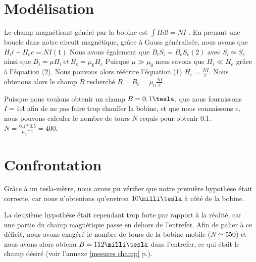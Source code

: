\section{Modélisation}
Le champ magnétisant généré par la bobine est $\int{H dl} = N I$ .
En prenant une boucle dans notre circuit magnétique, grâce à Gauss généralisée, nous avons que
$H_i l + H_e e = N I (1)$
Nous avons également que $B_i S_i = B_e S_e (2)$  avec $S_i \simeq S_e$
ainsi que $B_i = \mu H_i \:et\:  B_e = \mu_0 H_e$
Puisque $\mu \gg \mu_0$ nous savons que $H_i \ll H_e$ grâce à l'équation (2).
Nous pouvons alors réécrire l'équation (1) $H_e = \frac{N I}{e}$.
Nous obtenons alors le champ $B$ recherché $B = B_e = \mu_0 \frac{N I}{e}$.

Puisque nous voulons obtenir un champ $B = 0,1 \tesla$, que nous fournissons $I = 1 A$ afin de ne pas faire trop 
chauffer la bobine, et que nous connaissons $e$, nous pouvons calculer le nombre de tours $N$ requis pour obtenir 0.1\tesla.
$N = \frac{0.1 * 0.5}{\mu_0 * 1} = 400$.

\section{Confrontation}
Grâce à un tesla-mètre, nous avons pu vérifier que notre première hypothèse était correcte, car nous n'obtenions 
qu'environ $10 \milli\tesla$ à côté de la bobine. 

La deuxième hypothèse était cependant trop forte par rapport à la réalité, car une 
partie du champ magnétique passe en dehors de l'entrefer. Afin de palier à ce déficit, nous avons exagéré le nombre de 
tours de la bobine mobile ($N \simeq 550$) et nous avons alors obtenu $B = 112 \milli\tesla$ dans l'entrefer, 
ce qui était le champ désiré (voir l'annexe \ref{mesures champ} p.\pageref{mesures champ}).



